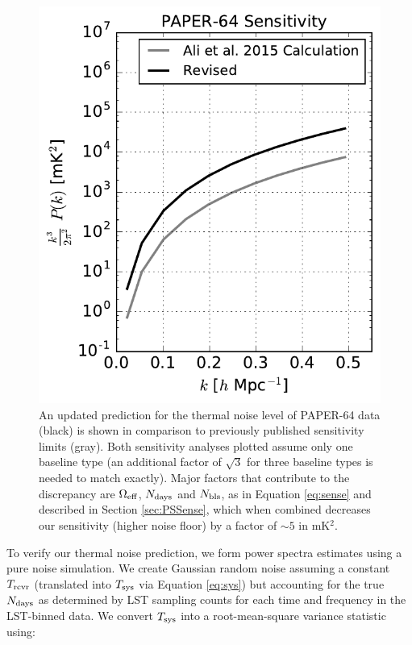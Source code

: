 \documentclass[preprint2,numberedappendix,tighten]{aastex6}
\begin{document}
\begin{figure}
	\centering
	\includegraphics[width=\columnwidth]{plots/sense_check.pdf}
	\caption{An updated prediction for the thermal noise level of PAPER-64 data (black) is shown in comparison to previously 
published sensitivity limits (gray). Both sensitivity analyses plotted assume only one baseline type (an additional factor of $
\sqrt{3}$ for three baseline types is needed to match  exactly). Major factors that contribute to the discrepancy are $
\Omega_{\rm eff}$, $N_{\rm days}$ and $N_{\rm bls}$, as in Equation \eqref{eq:sense} and described in Section \ref{sec:PSSense}, which when combined decreases our 
sensitivity (higher noise floor) by a factor of $\sim5$ in mK$^{2}$.}
	\label{fig:sense_check}
\end{figure}

To verify our thermal noise prediction, we form power spectra estimates using a pure noise simulation. We create Gaussian 
random noise assuming a constant $T_{\rm rcvr}$ (translated into $T_{\rm sys}$ via Equation \eqref{eq:sys}) but accounting for the true $N_{\rm days}$ as determined 
by LST sampling counts for each time and frequency in the LST-binned data. We convert $T_{\rm sys}$ into a root-mean-square variance statistic 
using:
\end{document}
